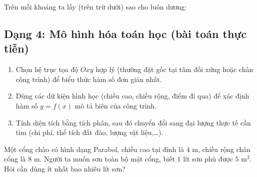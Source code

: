 \begin{loigiai}
Trên mỗi khoảng ta lấy (trên trừ dưới) sao cho luôn dương:
\end{loigiai}

\newpage
\subsection{Dạng 4: Mô hình hóa toán học (bài toán thực tiễn)}

\begin{hopphuongphap}
\begin{enumerate}[leftmargin=1cm]
  \item Chọn hệ trục tọa độ $Oxy$ hợp lý (thường đặt gốc tại tâm đối xứng hoặc chân công trình) để biểu thức hàm số đơn giản nhất.
  \item Dùng các dữ kiện hình học (chiều cao, chiều rộng, điểm đi qua) để xác định hàm số $y=f(x)$ mô tả biên của công trình.
  \item Tính diện tích bằng tích phân, sau đó chuyển đổi sang đại lượng thực tế cần tìm (chi phí, thể tích đất đào, lượng vật liệu,\ldots).
\end{enumerate}
\end{hopphuongphap}

\begin{hopvidu}
Một cổng chào có hình dạng Parabol, chiều cao tại đỉnh là $4$ m, chiều rộng chân cổng là $8$ m. Người ta muốn sơn toàn bộ mặt cổng, biết $1$ lít sơn phủ được $5$ m$^2$. Hỏi cần dùng ít nhất bao nhiêu lít sơn?
\end{hopvidu}

\begin{center}
\end{center}

